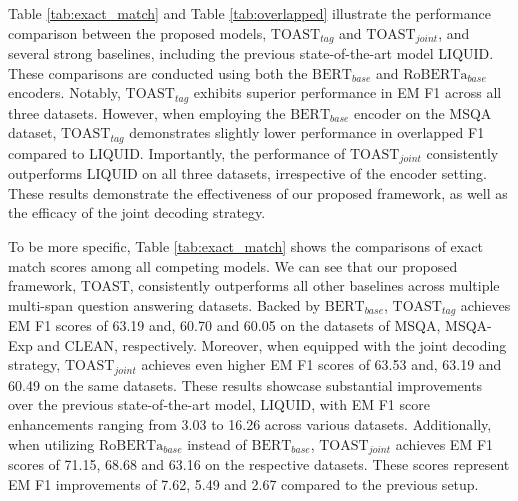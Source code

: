 \documentclass[a4paper]{cas-sc}
\newcommand{\1}[1]{\mathds{1}\left[#1\right]}
\newcommand{\tableref}[1]{Table \ref{#1}}
\begin{document}
\tableref{tab:exact_match} and \tableref{tab:overlapped} illustrate the performance comparison between the proposed models, $\text{TOAST}_{tag}$ and $\text{TOAST}_{joint}$, and  several strong baselines, including the previous state-of-the-art model LIQUID.
These comparisons are conducted using both the $\text{BERT}_{base}$  and $\text{RoBERTa}_{base}$ encoders. Notably, $\text{TOAST}_{tag}$ exhibits superior performance in EM F1 across all three datasets. However, when employing the $\text{BERT}_{base}$ encoder on the MSQA dataset, $\text{TOAST}_{tag}$ demonstrates slightly lower performance in overlapped F1 compared to LIQUID. Importantly, the performance of $\text{TOAST}_{joint}$ consistently outperforms LIQUID on all three datasets, irrespective of the encoder setting. These results demonstrate the effectiveness of our proposed framework, as well as the efficacy of the joint decoding strategy.

To be more specific, \tableref{tab:exact_match} shows the comparisons of exact match scores among all competing models. We can see that our proposed framework, TOAST, consistently outperforms all other baselines across multiple multi-span question answering datasets. Backed by $\text{BERT}_{base}$,    $\text{TOAST}_{tag}$ achieves EM F1 scores of 63.19 and, 60.70 and 60.05 on the datasets of MSQA, MSQA-Exp and CLEAN, respectively. Moreover, when equipped with the joint decoding strategy, $\text{TOAST}_{joint}$ achieves even higher EM F1 scores of 63.53 and, 63.19 and 60.49 on the same datasets.
These results showcase substantial improvements over the previous state-of-the-art model, LIQUID, with EM F1 score enhancements ranging from 3.03 to 16.26 across various datasets.
Additionally, when utilizing $\text{RoBERTa}_{base}$ instead of  $\text{BERT}_{base}$, $\text{TOAST}_{joint}$ 
achieves EM F1 scores of 71.15, 68.68 and 63.16 on the respective datasets. These scores represent EM F1 improvements of 7.62, 5.49 and 2.67 compared to the previous setup.
\end{document}
